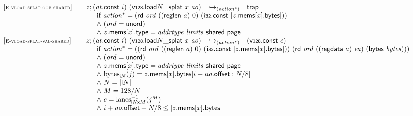 $$\begin{array}[t]{@{}lrcl@{}l@{}}
{} \\
{[\textsc{\scriptsize E{-}vload{-}splat{-}oob{-}shared}]} \quad & z ; ({\mathit{at}}{.}\mathsf{const}~i)~({\mathsf{v{\scriptstyle 128}}{.}\mathsf{load}}{{N}{\mathsf{\_}}{\mathsf{splat}}}~x~{\mathit{ao}}) & {\hookrightarrow}_{({{\mathit{action}}^\ast})} {} & \mathsf{trap} &  \\
& \multicolumn{4}{@{}l@{}}{\quad
\quad
\begin{array}[t]{@{}l@{}}
\mbox{if}~ {{\mathit{action}}^\ast} = (\mathsf{rd}~{\mathit{ord}}~((\mathsf{reglen}~a)~0)~(\mathsf{i{\scriptstyle 32}}{.}\mathsf{const}~{|z{.}\mathsf{mems}{}[x]{.}\mathsf{bytes}|})) \\
{\land}~ ({\mathit{ord}} = \mathsf{unord}) \\
{\land}~ z{.}\mathsf{mems}{}[x]{.}\mathsf{type} = {\mathit{addrtype}}~{\mathit{limits}}~\mathsf{shared}~\mathsf{page} \\
\end{array}
} \\
{[\textsc{\scriptsize E{-}vload{-}splat{-}val{-}shared}]} \quad & z ; ({\mathit{at}}{.}\mathsf{const}~i)~({\mathsf{v{\scriptstyle 128}}{.}\mathsf{load}}{{N}{\mathsf{\_}}{\mathsf{splat}}}~x~{\mathit{ao}}) & {\hookrightarrow}_{({{\mathit{action}}^\ast})} {} & (\mathsf{v{\scriptstyle 128}}{.}\mathsf{const}~c) &  \\
& \multicolumn{4}{@{}l@{}}{\quad
\quad
\begin{array}[t]{@{}l@{}}
\mbox{if}~ {{\mathit{action}}^\ast} = ((\mathsf{rd}~{\mathit{ord}}~((\mathsf{reglen}~a)~0)~(\mathsf{i{\scriptstyle 32}}{.}\mathsf{const}~{|z{.}\mathsf{mems}{}[x]{.}\mathsf{bytes}|}))~(\mathsf{rd}~{\mathit{ord}}~((\mathsf{regdata}~a)~{\mathit{ea}})~(\mathsf{bytes}~{\mathit{bytes}}))) \\
{\land}~ ({\mathit{ord}} = \mathsf{unord}) \\
{\land}~ z{.}\mathsf{mems}{}[x]{.}\mathsf{type} = {\mathit{addrtype}}~{\mathit{limits}}~\mathsf{shared}~\mathsf{page} \\
{\land}~ {{\mathrm{bytes}}}_{{\mathsf{i}}{N}}(j) = z{.}\mathsf{mems}{}[x]{.}\mathsf{bytes}{}[i + {\mathit{ao}}{.}\mathsf{offset} : N / 8] \\
{\land}~ N = {|{\mathsf{i}}{N}|} \\
{\land}~ M = 128 / N \\
{\land}~ c = {{{{\mathrm{lanes}}}_{{{\mathsf{i}}{N}}{\mathsf{x}}{M}}^{{-1}}}}{({j^{M}})} \\
{\land}~ i + {\mathit{ao}}{.}\mathsf{offset} + N / 8 \leq {|z{.}\mathsf{mems}{}[x]{.}\mathsf{bytes}|} \\

\end{array}}
\end{array}$$
